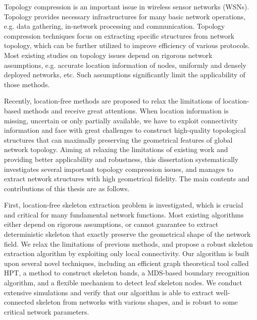 \begin{eabstract}
Topology compression is an important issue in wireless sensor networks (WSNs). Topology provides necessary infrastructures for many basic network operations, e.g. data gathering, in-network processing and communication. Topology compression techniques focus on extracting specific structures from network topology, which can be further utilized to improve efficiency of various protocols. Most existing studies on topology issues depend on rigorous network assumptions, e.g. accurate location information of nodes, uniformly and densely deployed networks, etc. Such assumptions significantly limit the applicability of those methods.

Recently, location-free methods are proposed to relax the limitations of location-based methods and receive great attentions. When location information is missing, uncertain or only partially available, we have to exploit connectivity information and face with great challenges to construct high-quality topological structures that can maximally preserving the geometrical features of global network topology. Aiming at relaxing the limitations of existing work and providing better applicability and robustness, this dissertation systematically investigates several important topology compression issues, and manages to extract network structures with high geometrical fidelity. The main contents and contributions of this thesis are as follows.

First, location-free skeleton extraction problem is investigated, which is crucial and critical for many fundamental network functions. Most existing algorithms either depend on rigorous assumptions, or cannot guarantee to extract deterministic skeleton that exactly preserve the geometrical shape of the network field. We relax the limitations of previous methods, and propose a robust skeleton extraction algorithm by exploiting only local connectivity. Our algorithm is built upon several novel techniques, including an efficient graph theoretical tool called HPT, a method to construct skeleton bands, a MDS-based boundary recognition algorithm, and a flexible mechanism to detect leaf skeleton nodes. We conduct extensive simulations and verify that our algorithm is able to extract well-connected skeleton from networks with various shapes, and is robust to some critical network parameters.


\end{eabstract}
